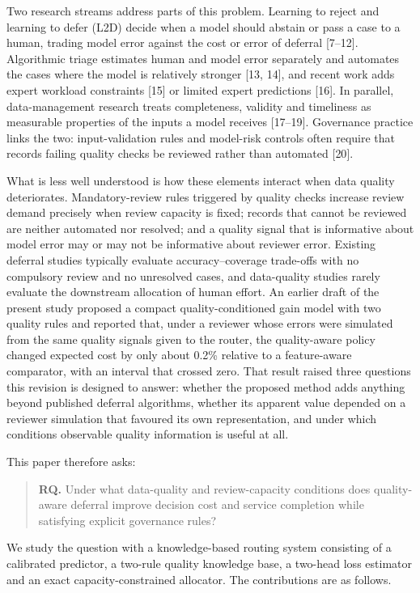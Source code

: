 \documentclass[
  11pt,
]{article}
\begin{document}
Two research streams address parts of this problem. Learning to reject
and learning to defer (L2D) decide when a model should abstain or pass a
case to a human, trading model error against the cost or error of
deferral {[}7--12{]}. Algorithmic triage estimates human and model error
separately and automates the cases where the model is relatively
stronger {[}13, 14{]}, and recent work adds expert workload constraints
{[}15{]} or limited expert predictions {[}16{]}. In parallel,
data-management research treats completeness, validity and timeliness as
measurable properties of the inputs a model receives {[}17--19{]}.
Governance practice links the two: input-validation rules and model-risk
controls often require that records failing quality checks be reviewed
rather than automated {[}20{]}.

What is less well understood is how these elements interact when data
quality deteriorates. Mandatory-review rules triggered by quality checks
increase review demand precisely when review capacity is fixed; records
that cannot be reviewed are neither automated nor resolved; and a
quality signal that is informative about model error may or may not be
informative about reviewer error. Existing deferral studies typically
evaluate accuracy--coverage trade-offs with no compulsory review and no
unresolved cases, and data-quality studies rarely evaluate the
downstream allocation of human effort. An earlier draft of the present
study proposed a compact quality-conditioned gain model with two quality
rules and reported that, under a reviewer whose errors were simulated
from the same quality signals given to the router, the quality-aware
policy changed expected cost by only about 0.2\% relative to a
feature-aware comparator, with an interval that crossed zero. That
result raised three questions this revision is designed to answer:
whether the proposed method adds anything beyond published deferral
algorithms, whether its apparent value depended on a reviewer simulation
that favoured its own representation, and under which conditions
observable quality information is useful at all.

This paper therefore asks:

\begin{quote}
\textbf{RQ.} Under what data-quality and review-capacity conditions does
quality-aware deferral improve decision cost and service completion
while satisfying explicit governance rules?
\end{quote}

We study the question with a knowledge-based routing system consisting
of a calibrated predictor, a two-rule quality knowledge base, a two-head
loss estimator and an exact capacity-constrained allocator. The
contributions are as follows.
\end{document}
